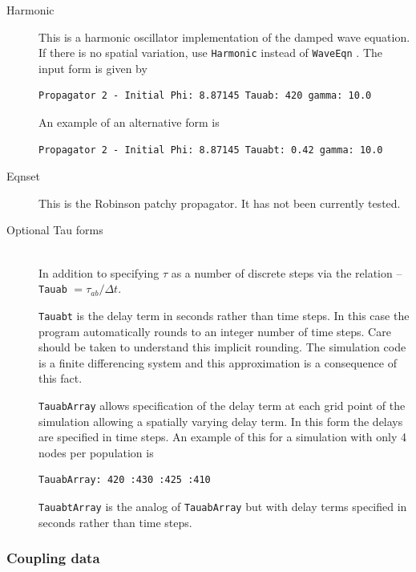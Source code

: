 \documentclass[12pt,a4paper]{article}
\newcommand{\type}[1]{ {\small\small\tt #1} }
\begin{document}
\begin{description}
	\item[Harmonic]
	This is a harmonic oscillator implementation of the damped wave equation. If there is no spatial variation, use \type{Harmonic} instead of \type{WaveEqn}.
	The input form is given by 
	\begin{lstlisting}
Propagator 2 - Initial Phi: 8.87145 Tauab: 420 gamma: 10.0
	\end{lstlisting}
	An example of an alternative form is
	\begin{lstlisting}
Propagator 2 - Initial Phi: 8.87145 Tauabt: 0.42 gamma: 10.0
	\end{lstlisting}

	\item[Eqnset]
	This is the Robinson patchy propagator. It has not been currently tested.

	\item[Optional Tau forms]\ \\

	In addition to specifying $\tau$ as a number of discrete steps via the relation -- \type{Tauab} $= \tau_{ab}/ \Delta t$.

	\type{Tauabt} is the delay term in seconds rather than time steps.  In this case the program automatically rounds to an integer number of time steps. Care should be taken to understand this implicit rounding.  The simulation code is a finite differencing system and this approximation is a consequence of this fact.

	\type{TauabArray} allows specification of the delay term at each grid point of the simulation allowing a spatially varying delay term. In this form the delays are specified in time steps. An example of this for a simulation with only 4 nodes per population is
	\begin{lstlisting}
TauabArray: 420 :430 :425 :410
	\end{lstlisting}
	\type{TauabtArray} is the analog of \type{TauabArray} but with delay terms specified in seconds rather than time steps.

\end{description}

\subsubsection{Coupling data}
\label{sec:couple}
\end{document}
